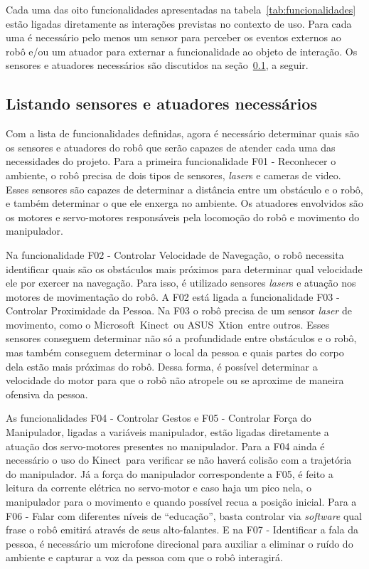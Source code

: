 Cada uma das oito funcionalidades apresentadas na tabela~\ref{tab:funcionalidades} estão ligadas diretamente as interações previstas no contexto de uso. Para cada uma é necessário pelo menos um sensor para perceber os eventos externos ao robô e/ou um atuador para externar a funcionalidade ao objeto de interação. Os sensores e atuadores necessários são discutidos na seção~\ref{sec:sensoresatuadores}, a seguir.

\subsection{Listando sensores e atuadores necessários}
\label{sec:sensoresatuadores}
Com a lista de funcionalidades definidas, agora é necessário determinar quais são os sensores e atuadores do robô que serão capazes de atender cada uma das necessidades do projeto. Para a primeira funcionalidade F01 - Reconhecer o ambiente, o robô precisa de dois tipos de sensores, \emph{laser}s e cameras de video. Esses sensores são capazes de determinar a distância entre um obstáculo e o robô, e também determinar o que ele enxerga no ambiente. Os atuadores envolvidos são os motores e servo-motores responsáveis pela locomoção do robô e movimento do manipulador.

Na funcionalidade F02 - Controlar Velocidade de Navegação, o robô necessita identificar quais são os obstáculos mais próximos para determinar qual velocidade ele por exercer na navegação. Para isso, é utilizado sensores \emph{laser}s e atuação nos motores de movimentação do robô. A F02 está ligada a funcionalidade F03 - Controlar Proximidade da Pessoa. Na F03 o robô precisa de um sensor \emph{laser} de movimento, como o Microsoft\textregistered\ Kinect\textregistered\ ou ASUS\textregistered\ Xtion\textregistered\, entre outros. Esses sensores conseguem determinar não só a profundidade entre obstáculos e o robô, mas também conseguem determinar o local da pessoa e quais partes do corpo dela estão mais próximas do robô. Dessa forma, é possível determinar a velocidade do motor para que o robô não atropele ou se aproxime de maneira ofensiva da pessoa.

As funcionalidades F04 - Controlar Gestos e F05 - Controlar Força do Manipulador, ligadas a variáveis manipulador, estão ligadas diretamente a atuação dos servo-motores presentes no manipulador. Para a F04 ainda é necessário o uso do Kinect\textregistered\ para verificar se não haverá colisão com a trajetória do manipulador. Já a força do manipulador correspondente a F05, é feito a leitura da corrente elétrica no servo-motor e caso haja um pico nela, o manipulador para o movimento e quando possível recua a posição inicial. Para a F06 - Falar com diferentes níveis de ``educação'', basta controlar via \emph{software} qual frase o robô emitirá através de seus alto-falantes. E na F07 - Identificar a fala da pessoa, é necessário um microfone direcional para auxiliar a eliminar o ruído do ambiente e capturar a voz da pessoa com que o robô interagirá.

